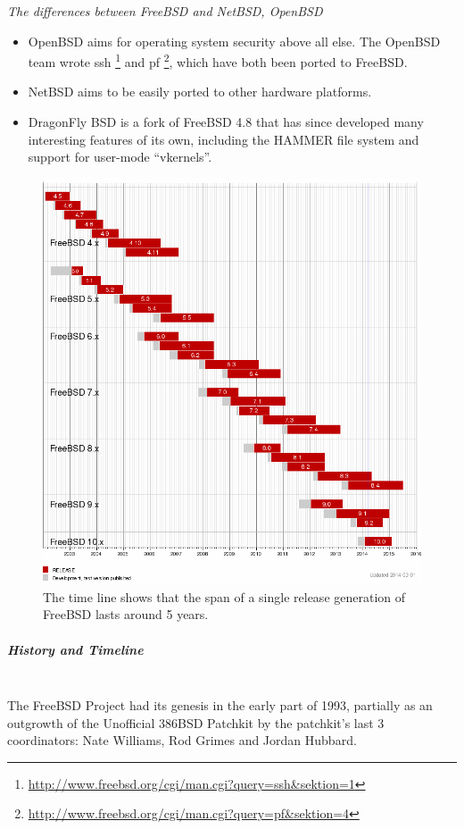 \documentclass[11pt]{article} %
\begin{document}
\textit{The differences between FreeBSD and NetBSD, OpenBSD}
\begin{itemize}
\item OpenBSD aims for operating system security above all else. The OpenBSD team wrote ssh \footnote{\url {http://www.freebsd.org/cgi/man.cgi?query=ssh&sektion=1}} and pf \footnote{\url{http://www.freebsd.org/cgi/man.cgi?query=pf&sektion=4}}, which have both been ported to FreeBSD.
\item NetBSD aims to be easily ported to other hardware platforms.
\item  DragonFly BSD is a fork of FreeBSD 4.8 that has since developed many interesting features of its own, including the HAMMER file system and support for user-mode “vkernels”.
\end{itemize}
       \begin{figure}
   \centering
        \includegraphics[scale=0.4]{./freebsd.png}
     \caption{ The time line shows that the span of a single release generation of FreeBSD lasts around 5 years.}
      \end{figure}


  \subparagraph{History and Timeline} \mbox{} \\
The FreeBSD Project had its genesis in the early part of 1993, partially as an outgrowth of the Unofficial 386BSD Patchkit by the patchkit's last 3 coordinators: Nate Williams, Rod Grimes and Jordan Hubbard.
\end{document}
